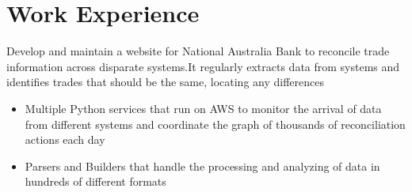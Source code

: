 \documentclass{resume}
\begin{document}
\section{Work Experience}
\begin{flushleft}
Develop and maintain a website for National Australia Bank to reconcile trade information across disparate systems.\linebreak It regularly extracts data from systems and identifies trades that should be the same, locating any differences
\begin{itemize}
  \item Multiple Python services that run on AWS to monitor the arrival of data from different systems and \linebreak coordinate the graph of thousands of reconciliation actions each day
  \item Parsers and Builders that handle the processing and analyzing of data in hundreds of different formats
\end{itemize}
\end{flushleft}
\end{document}
